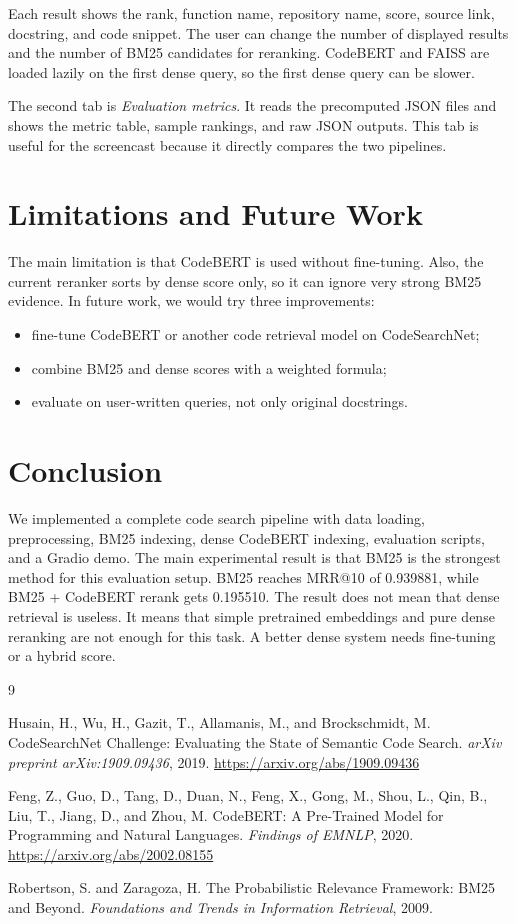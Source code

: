\documentclass[11pt]{article}
\begin{document}
Each result shows the rank, function name, repository name, score, source link,
docstring, and code snippet. The user can change the number of displayed results
and the number of BM25 candidates for reranking. CodeBERT and FAISS are loaded
lazily on the first dense query, so the first dense query can be slower.

The second tab is \textit{Evaluation metrics}. It reads the precomputed JSON
files and shows the metric table, sample rankings, and raw JSON outputs. This
tab is useful for the screencast because it directly compares the two pipelines.

\section{Limitations and Future Work}

The main limitation is that CodeBERT is used without fine-tuning. Also, the
current reranker sorts by dense score only, so it can ignore very strong BM25
evidence. In future work, we would try three improvements:
\begin{itemize}
    \item fine-tune CodeBERT or another code retrieval model on CodeSearchNet;
    \item combine BM25 and dense scores with a weighted formula;
    \item evaluate on user-written queries, not only original docstrings.
\end{itemize}

\section{Conclusion}

We implemented a complete code search pipeline with data loading, preprocessing,
BM25 indexing, dense CodeBERT indexing, evaluation scripts, and a Gradio demo.
The main experimental result is that BM25 is the strongest method for this
evaluation setup. BM25 reaches MRR@10 of 0.939881, while BM25 + CodeBERT rerank
gets 0.195510. The result does not mean that dense retrieval is useless. It means
that simple pretrained embeddings and pure dense reranking are not enough for
this task. A better dense system needs fine-tuning or a hybrid score.

\begin{thebibliography}{9}

Husain, H., Wu, H., Gazit, T., Allamanis, M., and Brockschmidt, M.
CodeSearchNet Challenge: Evaluating the State of Semantic Code Search.
\textit{arXiv preprint arXiv:1909.09436}, 2019.
\url{https://arxiv.org/abs/1909.09436}

Feng, Z., Guo, D., Tang, D., Duan, N., Feng, X., Gong, M., Shou, L., Qin, B.,
Liu, T., Jiang, D., and Zhou, M.
CodeBERT: A Pre-Trained Model for Programming and Natural Languages.
\textit{Findings of EMNLP}, 2020.
\url{https://arxiv.org/abs/2002.08155}

Robertson, S. and Zaragoza, H.
The Probabilistic Relevance Framework: BM25 and Beyond.
\textit{Foundations and Trends in Information Retrieval}, 2009.

\end{thebibliography}
\end{document}
